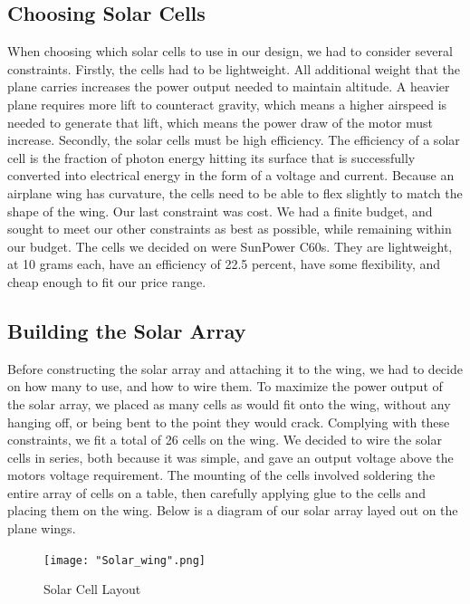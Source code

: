 \documentclass[12pt,journal,compsoc]{IEEEtran}
\begin{document}
\subsection{Choosing Solar Cells}
When choosing which solar cells to use in our design, we had to consider several constraints. Firstly, the cells had to be lightweight. All additional weight that the plane carries increases the power output needed to maintain altitude. A heavier plane requires more lift to counteract gravity, which means a higher airspeed is needed to generate that lift, which means the power draw of the motor must increase. Secondly, the solar cells must be high efficiency. The efficiency of a solar cell is the fraction of photon energy hitting its surface that is successfully converted into electrical energy in the form of a voltage and current. Because an airplane wing has curvature, the cells need to be able to flex slightly to match the shape of the wing. Our last constraint was cost. We had a finite budget, and sought to meet our other constraints as best as possible, while remaining within our budget. The cells we decided on were SunPower C60s. They are lightweight, at 10 grams each, have an efficiency of 22.5 percent, have some flexibility, and cheap enough to fit our price range.

\subsection{Building the Solar Array}
Before constructing the solar array and attaching it to the wing, we had to decide on how many to use, and how to wire them.  To maximize the power output of the solar array, we placed as many cells as would fit onto the wing, without any hanging off, or being bent to the point they would crack. Complying with these constraints, we fit a total of 26 cells on the wing. We decided to wire the solar cells in series, both because it was simple, and gave an output voltage above the motors voltage requirement. The mounting of the cells involved soldering the entire array of cells on a table, then carefully applying glue to the cells and placing them on the wing. Below is a diagram of our solar array layed out on the plane wings.

\begin{figure}[h!]
\hspace*{0cm}
\centering
\texttt{[image: "Solar\_wing".png]}
\caption{Solar Cell Layout}
\label{}
\end{figure}
\end{document}
